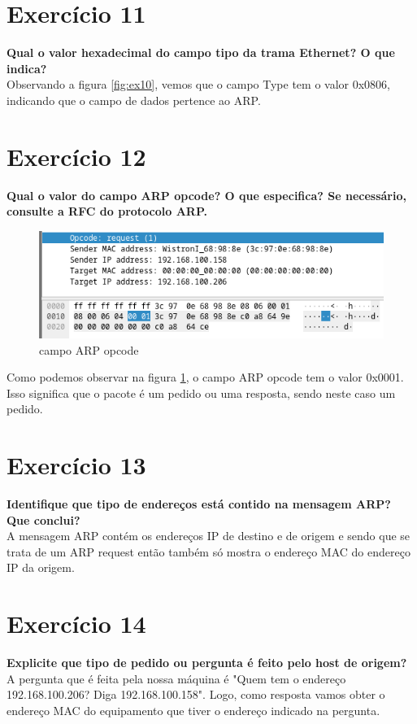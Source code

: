 \documentclass[a4paper]{report}
\begin{document}
\section{Exercício 11}
\textbf{Qual o valor hexadecimal do campo tipo da trama Ethernet? O que
indica?}\\
Observando a figura \ref{fig:ex10}, vemos que o campo Type tem o valor 0x0806, 
indicando que o campo de dados pertence ao ARP.

\section{Exercício 12}
\textbf{Qual o valor do campo ARP opcode? O que especifica?  Se necessário,
consulte a RFC do protocolo ARP.}

\begin{figure}[H]
    \centering 
    \includegraphics[width=\textwidth]{images/ex12.png}
    \caption{campo ARP opcode}
    \label{fig:ex12}
\end{figure}
Como podemos observar na figura \ref{fig:ex12}, o campo ARP opcode tem o valor
0x0001. Isso significa que o pacote é um pedido ou uma resposta, sendo neste
caso um pedido.

\section{Exercício 13}
\textbf{Identifique que tipo de endereços está contido na mensagem ARP? Que
conclui?}\\
A mensagem ARP contém os endereços IP de destino e de origem e sendo que se
trata de um ARP request então também só mostra o endereço MAC do endereço IP da
origem.

\section{Exercício 14}
\textbf{Explicite que tipo de pedido ou pergunta é feito pelo host de origem?}\\
A pergunta que é feita pela nossa máquina é "Quem tem o endereço
192.168.100.206? Diga 192.168.100.158". Logo, como resposta vamos obter o
endereço MAC do equipamento que tiver o endereço indicado na pergunta.
\end{document}
